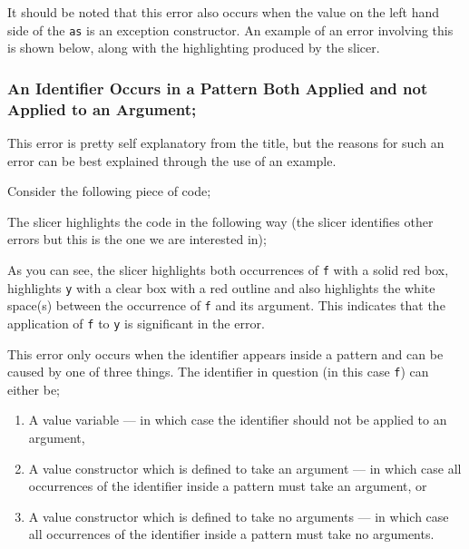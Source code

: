 \documentclass{report}
\begin{document}
\begin{itemize}
It should be noted that this error also occurs when the value on the
left hand side of the \texttt{as} is an exception constructor.
An example of an error involving this is shown below, along with the
highlighting produced by the slicer.






\newpage


\subsubsection{An Identifier Occurs in a Pattern Both Applied and not Applied
  to an Argument;}

\subitem This error is pretty self explanatory from the title, but the
reasons for such an error can be best explained through the use of an
example.

Consider the following piece of code;


The slicer highlights the code in the following way (the slicer
identifies other errors but this is the one we are interested in);


As you can see, the slicer highlights both occurrences of
\texttt{f} with a solid red box, highlights
\texttt{y} with a clear box with a red outline and also
highlights the white space(s) between the occurrence of
\texttt{f} and its argument. This indicates
that the application of \texttt{f} to \texttt{y} is
significant in the error.

This error only occurs when the identifier appears inside a pattern
and can be caused by one of three things. The identifier in
question (in this case \texttt{f}) can either be;

\begin{enumerate}
\item A value variable --- in which case the identifier should not be
  applied to an argument,
\item A value constructor which is defined to take an argument --- in
  which case all occurrences of the identifier inside a pattern must take
  an argument, or
\item A value constructor which is defined to take no arguments --- in
  which case all occurrences of the identifier inside a pattern must take no arguments.
\end{enumerate}


\end{itemize}
\end{document}
